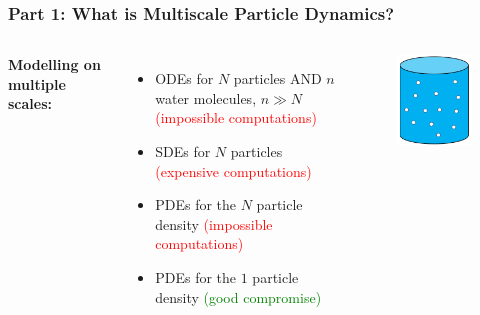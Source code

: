 \documentclass[aspectratio=169,xcolor=dvipsnames]{beamer}
\begin{document}
\begin{frame}
	\frametitle{Part 1: What is Multiscale Particle Dynamics?}
	\begin{columns}
		\textbf{Modelling on multiple scales:}
		\vspace{0.4cm}
		\begin{itemize}
			\item ODEs for $N$ particles AND $n$ water molecules, $n \gg N$\\ \textcolor{red}{(impossible computations)}
			\item SDEs for $N$ particles \textcolor{red}{(expensive computations)}
			\item PDEs for the $N$ particle density  \textcolor{red}{(impossible computations)}
			\item PDEs for the $1$ particle density \textcolor{green}{(good compromise)}
		\end{itemize}
	
	\begin{figure}
		\includegraphics[width=4cm]{Particles3.png}
	\end{figure}
	\end{columns}
\end{frame}
\end{document}
